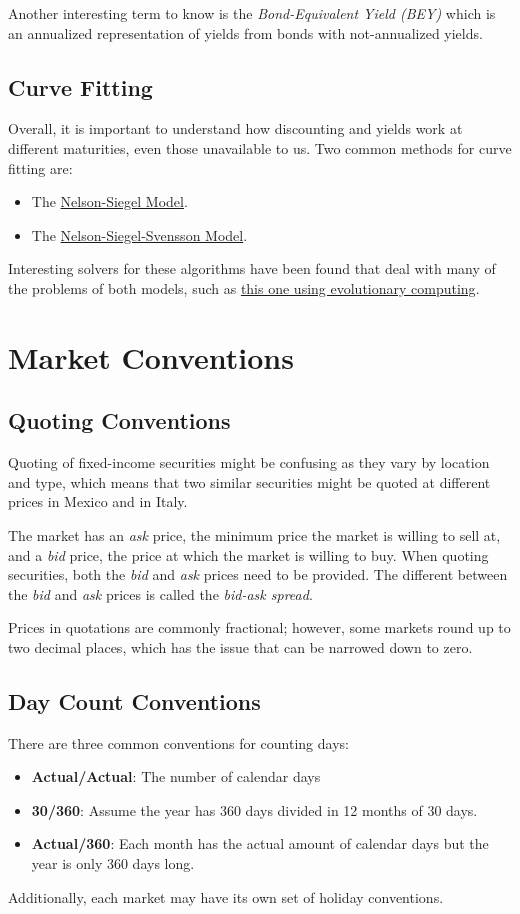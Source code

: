 \documentclass[10pt,letterpaper]{article}
\begin{document}
Another interesting term to know is the \emph{Bond-Equivalent Yield (BEY)} which is an annualized representation of yields from bonds with not-annualized yields.

\subsection{Curve Fitting}

Overall, it is important to understand how discounting and yields work at different maturities, even those unavailable to us. Two common methods for curve fitting are:

\begin{itemize}
\item The \href{https://econpapers.repec.org/article/ucpjnlbus/v_3a60_3ay_3a1987_3ai_3a4_3ap_3a473-89.htm}{Nelson-Siegel Model}.
\item The \href{https://www.academia.edu/9582801/The_Nelson_Siegel_Svensson_approach}{Nelson-Siegel-Svensson Model}.
\end{itemize}

Interesting solvers for these algorithms have been found that deal with many of the problems of both models, such as \href{https://arxiv.org/pdf/2108.01760.pdf}{this one using evolutionary computing}.

\section{Market Conventions}
\subsection{Quoting Conventions}
Quoting of fixed-income securities might be confusing as they vary by location and type, which means that two similar securities might be quoted at different prices in Mexico and in Italy.

The market has an \emph{ask} price, the minimum price the market is willing to sell at, and a \emph{bid} price, the price at which the market is willing to buy. When quoting securities, both the \emph{bid} and \emph{ask} prices need to be provided. The different between the \emph{bid} and \emph{ask} prices is called the \emph{bid-ask spread}.

Prices in quotations are commonly fractional; however, some markets round up to two decimal places, which has the issue that can be narrowed down to zero.

\subsection{Day Count Conventions}
There are three common conventions for counting days:
\begin{itemize}
\item \textbf{Actual/Actual}: The number of calendar days
\item \textbf{30/360}: Assume the year has 360 days divided in 12 months of 30 days.
\item \textbf{Actual/360}: Each month has the actual amount of calendar days but the year is only 360 days long.
\end{itemize}
Additionally, each market may have its own set of holiday conventions.
\end{document}
